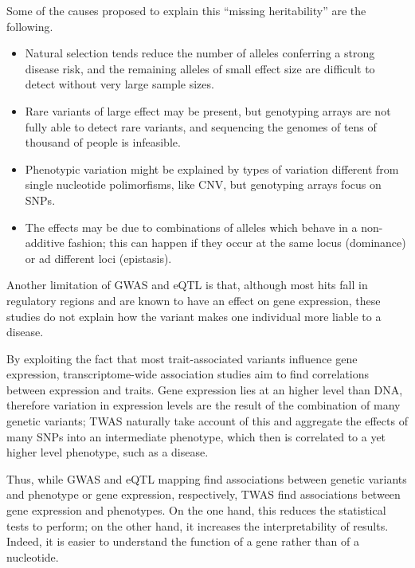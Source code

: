 \documentclass[../main.tex]{subfiles}
\begin{document}
Some of the causes proposed to explain this \enquote{missing 
	heritability} are the following.
\begin{itemize}
	\item Natural selection tends reduce the number of alleles 
		conferring a strong disease risk, and the remaining alleles of 
		small effect size are difficult to detect without very large 
		sample sizes.
	\item Rare variants of large effect may be present, but genotyping 
		arrays are not fully able to detect rare variants, and 
		sequencing the genomes of tens of thousand of people is 
		infeasible.
	\item Phenotypic variation might be explained by types of variation 
		different from single nucleotide polimorfisms, like CNV, but 
		genotyping arrays focus on SNPs.
	\item The effects may be due to combinations of alleles which behave 
		in a non-additive fashion; this can happen if they occur at the 
		same locus (dominance) or ad different loci (epistasis).
\end{itemize}


Another limitation of GWAS and eQTL is that, although most hits fall in 
regulatory regions and are known to have an effect on gene expression, 
these studies do not explain how the variant makes one individual more 
liable to a disease.

By exploiting the fact that most trait-associated variants influence 
gene expression, transcriptome-wide association studies aim to find 
correlations between expression and traits. Gene expression lies at an 
higher level than DNA, therefore variation in expression levels are the 
result of the combination of many genetic variants; TWAS naturally take 
account of this and aggregate the effects of many SNPs into an 
intermediate phenotype, which then is correlated to a yet higher level 
phenotype, such as a disease.

Thus, while GWAS and eQTL mapping find associations between genetic 
variants and phenotype or gene expression, respectively, TWAS find 
associations between gene expression and phenotypes. On the one hand, 
this reduces the statistical tests to perform; on the other hand, it 
increases the interpretability of results. Indeed, it is easier to 
understand the function of a gene rather than of a nucleotide.
\end{document}
